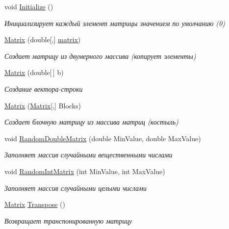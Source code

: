 \begin{DoxyCompactItemize}
void \hyperlink{class_b_l_a_s_1_1_matrix_ac86fdeae6e5a0d2aa7475f432b85eed0}{Initialize} ()
\begin{DoxyCompactList}\small\item\em Инициализирует каждый элемент матрицы значением по умолчанию (0) \end{DoxyCompactList}\item 
\hyperlink{class_b_l_a_s_1_1_matrix_a1147c79d0709bd25b4a1c605f5542f53}{Matrix} (double\mbox{[},\mbox{]} \hyperlink{class_b_l_a_s_1_1_matrix_a715e9d838fc32eecd436e1f83ffcde79}{matrix})
\begin{DoxyCompactList}\small\item\em Создает матрицу из двумерного массива (копирует элементы) \end{DoxyCompactList}\item 
\hyperlink{class_b_l_a_s_1_1_matrix_a1bcb586901d3f49412c9e98e6f9e3917}{Matrix} (double\mbox{[}$\,$\mbox{]} b)
\begin{DoxyCompactList}\small\item\em Создание вектора-\/строки \end{DoxyCompactList}\item 
\hyperlink{class_b_l_a_s_1_1_matrix_ae5da8590bfbd38c7ea0b924bb3c950cc}{Matrix} (\hyperlink{class_b_l_a_s_1_1_matrix}{Matrix}\mbox{[},\mbox{]} Blocks)
\begin{DoxyCompactList}\small\item\em Создает блочную матрицу из массива матриц (костыль) \end{DoxyCompactList}\item 
void \hyperlink{class_b_l_a_s_1_1_matrix_a7d892ff1da86df3d8b3f69d78349f563}{Random\+Double\+Matrix} (double Min\+Value, double Max\+Value)
\begin{DoxyCompactList}\small\item\em Заполняет массив случайными вещественными числами \end{DoxyCompactList}\item 
void \hyperlink{class_b_l_a_s_1_1_matrix_a345564b81477b189e905d0bd7347b1c2}{Random\+Int\+Matrix} (int Min\+Value, int Max\+Value)
\begin{DoxyCompactList}\small\item\em Заполняет массив случайными целыми числами \end{DoxyCompactList}\item 
\hyperlink{class_b_l_a_s_1_1_matrix}{Matrix} \hyperlink{class_b_l_a_s_1_1_matrix_a7917b89e566d41ce3e80e039bfe414db}{Transpose} ()
\begin{DoxyCompactList}\small\item\em Возвращает транспонированную матрицу \end{DoxyCompactList}\item 

\end{DoxyCompactItemize}
